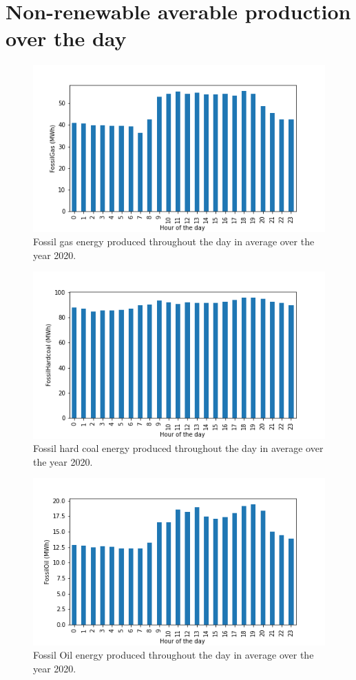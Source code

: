 \documentclass[11pt]{article} %
\begin{document}
\clearpage\newpage
\section{Non-renewable averable production over the day}\label{app:non_renewable}
\begin{figure}[h!]
  \includegraphics[width=0.8\linewidth]{../outputs/FossilGas.png}
  \caption{Fossil gas energy produced throughout the day in average over the year 2020.}
  \label{fig:gas_kwh}
\end{figure}
\begin{figure}[h!]
  \includegraphics[width=0.8\linewidth]{../outputs/FossilHardcoal.png}
  \caption{Fossil hard coal energy produced throughout the day in average over the year 2020.}
  \label{fig:coal_kwh}
\end{figure}
\begin{figure}[h!]
  \includegraphics[width=0.8\linewidth]{../outputs/FossilOil.png}
  \caption{Fossil Oil energy produced throughout the day in average over the year 2020.}
  \label{fig:oil_kwh}
\end{figure}
\end{document}
